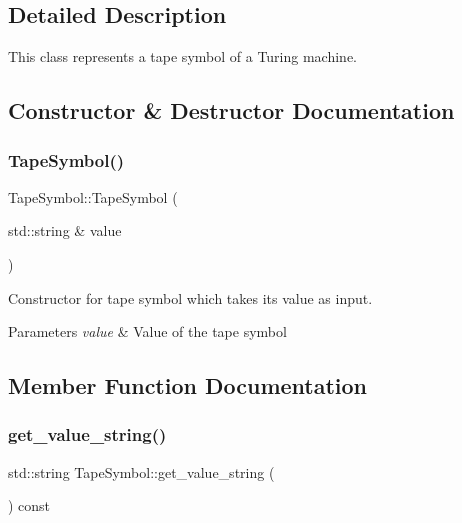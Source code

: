 \subsection{Detailed Description}
This class represents a tape symbol of a Turing machine. 

\subsection{Constructor \& Destructor Documentation}
\mbox{\label{classTapeSymbol_ac4babc556460fd8d7da09115d9b19076}} 
\subsubsection{\texorpdfstring{Tape\+Symbol()}{TapeSymbol()}}
{\footnotesize\ttfamily Tape\+Symbol\+::\+Tape\+Symbol (\begin{DoxyParamCaption}\item[{std\+::string \&}]{value }\end{DoxyParamCaption})\hspace{0.3cm}{\ttfamily [explicit]}}



Constructor for tape symbol which takes its value as input. 


\begin{DoxyParams}{Parameters}
{\em value} & Value of the tape symbol \\
\hline
\end{DoxyParams}


\subsection{Member Function Documentation}
\mbox{\label{classTapeSymbol_a4f995f73db8026a4511cac0e7da6b66a}} 
\subsubsection{\texorpdfstring{get\+\_\+value\+\_\+string()}{get\_value\_string()}}
{\footnotesize\ttfamily std\+::string Tape\+Symbol\+::get\+\_\+value\+\_\+string (\begin{DoxyParamCaption}{ }\end{DoxyParamCaption}) const}



